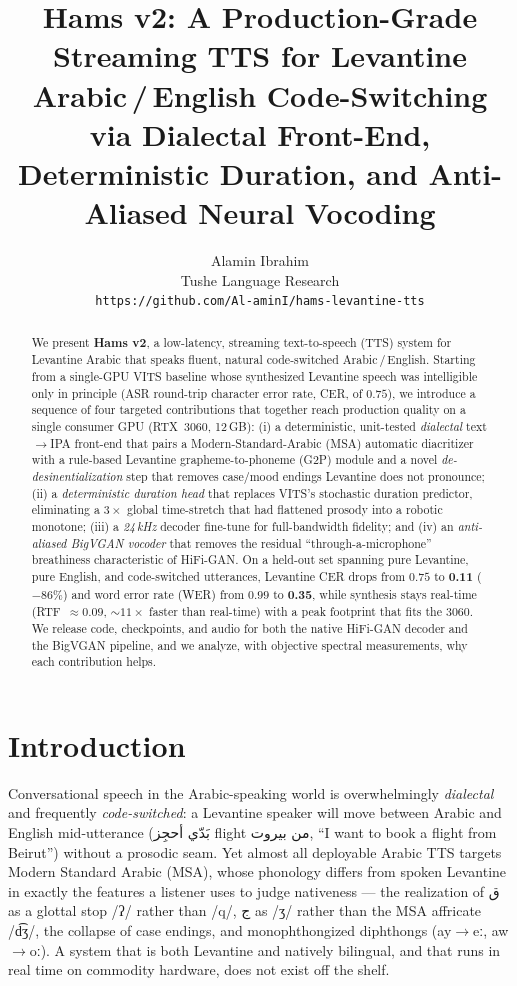 \documentclass[10pt,twocolumn]{article}
\title{\vspace{-3.5em}\bfseries Hams v2: A Production-Grade Streaming TTS for
Levantine Arabic\,/\,English Code-Switching\\[0.2em]
\large via Dialectal Front-End, Deterministic Duration, and Anti-Aliased Neural Vocoding}
\author{Alamin Ibrahim\\ \small Tushe Language Research \\ \small \texttt{https://github.com/Al-aminI/hams-levantine-tts}}
\date{}
\newcommand{\ipa}[1]{{\ipafont #1}}
\newcommand{\ar}[1]{{\arabicfont #1}}
\newcommand{\best}[1]{\textbf{#1}}
\begin{document}
\maketitle

\begin{abstract}
\noindent
We present \textbf{Hams v2}, a low-latency, streaming text-to-speech (TTS) system for
Levantine Arabic that speaks fluent, natural code-switched Arabic\,/\,English. Starting
from a single-GPU VITS baseline whose synthesized Levantine speech was intelligible only
in principle (ASR round-trip character error rate, CER, of \(0.75\)), we introduce a
sequence of four targeted contributions that together reach production quality on a single
consumer GPU (RTX~3060, 12\,GB): (i) a deterministic, unit-tested \emph{dialectal}
text\(\rightarrow\)IPA front-end that pairs a Modern-Standard-Arabic (MSA) automatic
diacritizer with a rule-based Levantine grapheme-to-phoneme (G2P) module and a novel
\emph{de-desinentialization} step that removes case/mood endings Levantine does not
pronounce; (ii) a \emph{deterministic duration head} that replaces VITS's stochastic
duration predictor, eliminating a \(3\times\) global time-stretch that had flattened prosody
into a robotic monotone; (iii) a \emph{24\,kHz} decoder fine-tune for full-bandwidth
fidelity; and (iv) an \emph{anti-aliased BigVGAN vocoder} that removes the residual
``through-a-microphone'' breathiness characteristic of HiFi-GAN. On a held-out set spanning
pure Levantine, pure English, and code-switched utterances, Levantine CER drops from
\(0.75\) to \best{0.11} (\(-86\%\)) and word error rate (WER) from \(0.99\) to \best{0.35},
while synthesis stays real-time (RTF~\(\approx\!0.09\), \(\sim\!11\times\) faster than
real-time) with a peak footprint that fits the 3060. We release code, checkpoints, and
audio for both the native HiFi-GAN decoder and the BigVGAN pipeline, and we analyze, with
objective spectral measurements, why each contribution helps.
\end{abstract}

\section{Introduction}
Conversational speech in the Arabic-speaking world is overwhelmingly \emph{dialectal} and
frequently \emph{code-switched}: a Levantine speaker will move between Arabic and English
mid-utterance (\ar{بَدّي أحجِز flight من بيروت}, ``I want to book a flight from Beirut'')
without a prosodic seam. Yet almost all deployable Arabic TTS targets Modern Standard
Arabic (MSA), whose phonology differs from spoken Levantine in exactly the features a
listener uses to judge nativeness --- the realization of \ar{ق} as a glottal stop
\ipa{/ʔ/} rather than \ipa{/q/}, \ar{ج} as \ipa{/ʒ/} rather than the MSA affricate
\ipa{/d͡ʒ/}, the collapse of case endings, and monophthongized diphthongs
(\ipa{ay\(\rightarrow\)eː}, \ipa{aw\(\rightarrow\)oː}). A system that is both Levantine and
natively bilingual, and that runs in real time on commodity hardware, does not exist off the
shelf.
\end{document}
